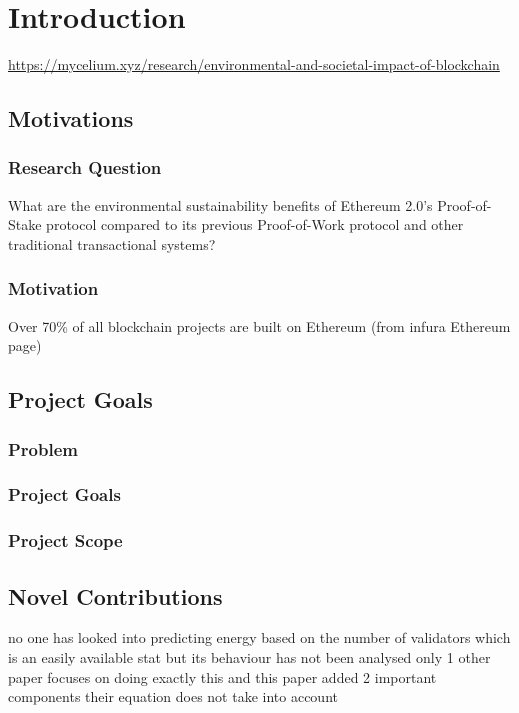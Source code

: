 \chapter{Introduction}
\url{https://mycelium.xyz/research/environmental-and-societal-impact-of-blockchain}
\section{Motivations}

\subsection{Research Question}

What are the environmental sustainability benefits of Ethereum 2.0's Proof-of-Stake protocol compared to its previous Proof-of-Work protocol and other traditional transactional systems?

\subsection{Motivation}

Over 70\% of all blockchain projects are built on Ethereum (from infura Ethereum page)


\section{Project Goals}
\subsection{Problem}
\subsection{Project Goals}
\subsection{Project Scope}

\section{Novel Contributions}

no one has looked into predicting energy based on the number of validators which is an easily available stat but its behaviour has not been analysed
only 1 other paper focuses on doing exactly this and this paper added 2 important components their equation does not take into account
